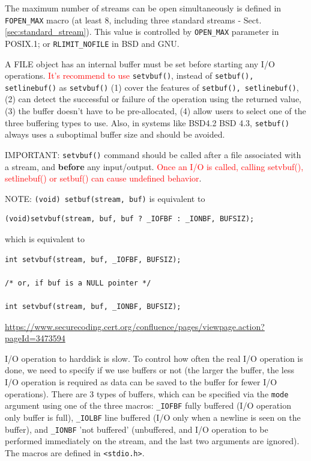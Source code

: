 \begin{mdframed}
The maximum number of streams can be open simultaneously is defined in
\verb!FOPEN_MAX! macro (at least 8, including three standard streams -
Sect.\ref{sec:standard_stream}). This value is controlled by \verb!OPEN_MAX!
parameter in POSIX.1; or \verb!RLIMIT_NOFILE! in BSD and GNU.
\end{mdframed}

A FILE object has an internal buffer must be set before starting any I/O
operations. \textcolor{red}{It's recommend to use} \verb!setvbuf()!, instead of
\verb!setbuf(), setlinebuf()! as \verb!setvbuf()! (1) cover the features of
\verb!setbuf(), setlinebuf()!, (2) can detect the successful or failure of the
operation using the returned value, (3) the buffer doesn't have to be
pre-allocated, (4) allow users to select one of the three buffering types to
use. Also, in systems like BSD4.2 BSD 4.3, \verb!setbuf()! always uses a
suboptimal buffer size and should be avoided.

IMPORTANT: \verb!setvbuf()! command should be called after a file associated
with a stream, and {\bf before} any input/output.
\textcolor{red}{Once an I/O is called, calling setvbuf(), setlinebuf() or
setbuf() can cause undefined behavior}.

\begin{mdframed}
NOTE: \verb!(void) setbuf(stream, buf)! is
equivalent to
\begin{verbatim}
(void)setvbuf(stream, buf, buf ? _IOFBF : _IONBF, BUFSIZ);
\end{verbatim}
which is equivalent to
\begin{verbatim}
int setvbuf(stream, buf, _IOFBF, BUFSIZ);

/* or, if buf is a NULL pointer */

int setvbuf(stream, buf, _IONBF, BUFSIZ);
\end{verbatim}
\url{https://www.securecoding.cert.org/confluence/pages/viewpage.action?pageId=3473594}

\end{mdframed}

I/O operation to harddisk is slow. To control how often the real I/O operation
is done, we need to specify if we use buffers or not (the larger the buffer, the
less I/O operation is required as data can be saved to the buffer for fewer I/O
operations). There are 3 types of buffers, which can be specified via the
\verb!mode! argument using one of the three macros: \verb!_IOFBF! fully buffered
(I/O operation only buffer is full), \verb!_IOLBF! line buffered (I/O only when
a newline is seen on the buffer), and \verb!_IONBF! 'not buffered' (unbuffered,
and I/O operation to be performed immediately on the stream, and the last two
arguments are ignored). The macros are defined in \verb!<stdio.h>!.

